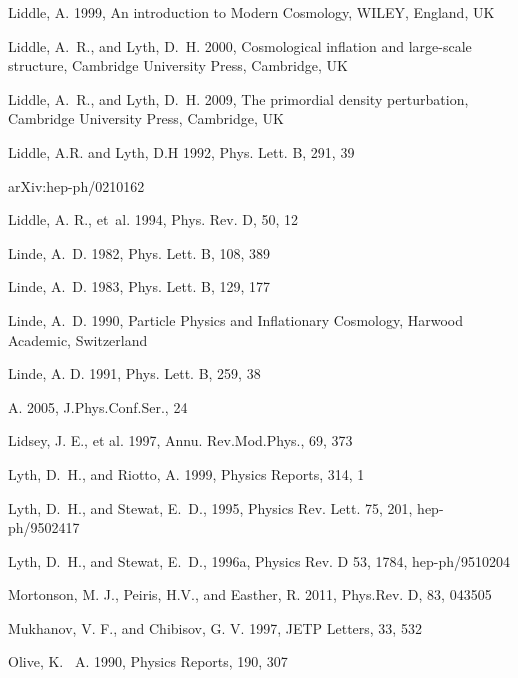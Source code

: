 \documentclass{rmaa}
\begin{document}
\begin{thebibliography}
Liddle, A. 1999, An introduction to Modern Cosmology, WILEY, England, UK

 Liddle, A.~R., and  Lyth, D.~H. 2000, Cosmological inflation and large-scale structure,
  Cambridge University Press, Cambridge, UK 

 Liddle, A.~R., and  Lyth, D.~H. 2009, The primordial density perturbation,
  Cambridge University Press, Cambridge, UK 
  
 Liddle, A.R. and Lyth, D.H 1992, Phys. Lett. B, 291, 39

  arXiv:hep-ph/0210162

  Liddle, A. R., et~al. 1994, Phys. Rev. D, 50, 12
  
Linde, A.~D. 1982, Phys. Lett. B, 108,  389 
 
 Linde, A.~D. 1983, Phys. Lett. B, 129, 177 

 Linde, A.~D. 1990, Particle Physics and Inflationary Cosmology, Harwood Academic,
Switzerland 

 Linde, A. D. 1991, Phys. Lett. B,  259, 38
 
 A. 2005, J.Phys.Conf.Ser., 24 
 
  Lidsey, J. E., et al. 1997, Annu. Rev.Mod.Phys., 69,  373  
 
Lyth, D.~H., and {Riotto,} A. 1999, Physics Reports, 314, 1

Lyth, D.~H., and {Stewat,} E.~D., 1995, Physics Rev. Lett. 75, 201, hep-ph/9502417

Lyth, D.~H., and {Stewat,} E.~D., 1996a, Physics Rev. D 53, 1784, hep-ph/9510204

Mortonson, M. J., Peiris, H.V., and Easther, R. 2011, Phys.Rev. D, 83, 043505 
  
 Mukhanov, V. F., and {Chibisov,} G. V. 1997, JETP Letters, 33, 532
  
 Olive, K. ~A. 1990, Physics Reports, 190, 307  


\end{thebibliography}
\end{document}
